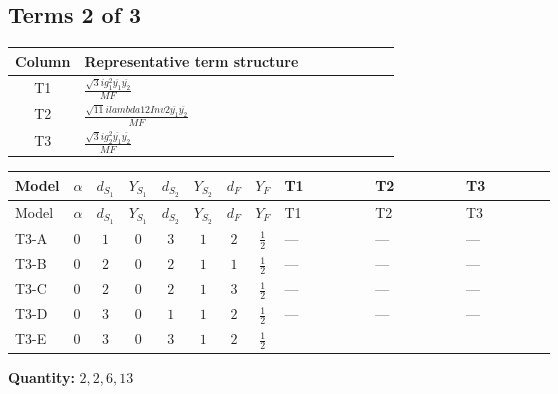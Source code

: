 \documentclass[8pt]{article}
\begin{document}
\begin{landscape}
\subsection*{Terms 2 of 3}
\begin{center}
\begin{tabular}{@{}c >{\raggedright\arraybackslash}p{0.82\linewidth}@{}}
\toprule
Column & Representative term structure \\
\midrule
T1 & \(\displaystyle \frac{\sqrt{3} i g_{1}^{2} \overline{y_{1}} \overline{y_{2}}}{MF}\) \\
\midrule
T2 & \(\displaystyle \frac{\sqrt{11} i lambda12Inv2 \overline{y_{1}} \overline{y_{2}}}{MF}\) \\
\midrule
T3 & \(\displaystyle \frac{\sqrt{3} i g_{2}^{2} \overline{y_{1}} \overline{y_{2}}}{MF}\) \\
\midrule
\bottomrule
\end{tabular}
\end{center}
\smallskip
\tiny
\begin{longtable}{@{}llcccccc >{\raggedright\arraybackslash}p{0.21\linewidth} >{\raggedright\arraybackslash}p{0.21\linewidth} >{\raggedright\arraybackslash}p{0.21\linewidth}@{}}
\toprule
Model & $\alpha$ & $d_{S_1}$ & $Y_{S_1}$ & $d_{S_2}$ & $Y_{S_2}$ & $d_F$ & $Y_F$ & T1 & T2 & T3 \\
\midrule
\endfirsthead
\toprule
Model & $\alpha$ & $d_{S_1}$ & $Y_{S_1}$ & $d_{S_2}$ & $Y_{S_2}$ & $d_F$ & $Y_F$ & T1 & T2 & T3 \\
\midrule
\endhead
T3-A & $0$ & $1$ & $0$ & $3$ & $1$ & $2$ & $\frac{1}{2}$ & --- & --- & --- \\
\midrule
T3-B & $0$ & $2$ & $0$ & $2$ & $1$ & $1$ & $\frac{1}{2}$ & --- & --- & --- \\
\midrule
T3-C & $0$ & $2$ & $0$ & $2$ & $1$ & $3$ & $\frac{1}{2}$ & --- & --- & --- \\
\midrule
T3-D & $0$ & $3$ & $0$ & $1$ & $1$ & $2$ & $\frac{1}{2}$ & --- & --- & --- \\
\midrule
T3-E & $0$ & $3$ & $0$ & $3$ & $1$ & $2$ & $\frac{1}{2}$ & \scriptsize\adjustbox{max width=\linewidth}{$\begin{gathered} \frac{\sqrt{3} i g_{1}^{2} \overline{y_{1}} \overline{y_{2}}}{8 MF}\end{gathered}$} & \scriptsize\adjustbox{max width=\linewidth}{$\begin{gathered} \frac{3 \sqrt{11} i lambda12Inv2 \overline{y_{1}} \overline{y_{2}}}{22 MF}\end{gathered}$} & \scriptsize\adjustbox{max width=\linewidth}{$\begin{gathered} \frac{49 \sqrt{3} i g_{2}^{2} \overline{y_{1}} \overline{y_{2}}}{24 MF}\end{gathered}$} \\
\midrule
\bottomrule
\end{longtable}
\clearpage
\noindent\textbf{Quantity: }$\mathrm{2,2,6,13}$\par\smallskip

\end{landscape}
\end{document}
